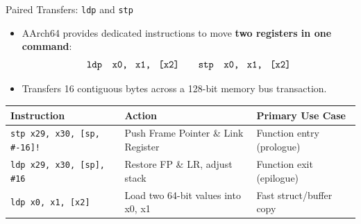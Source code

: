 \documentclass[aspectratio=169,11pt,t]{beamer}
\newcommand{\key}[1]{\textbf{#1}}
\newcommand{\code}[1]{\texttt{#1}}
\begin{document}
\begin{frame}{Paired Transfers: \texttt{ldp} and \texttt{stp}}
\large
\begin{itemize}\setlength{\itemsep}{6pt}
  \item AArch64 provides dedicated instructions to move \key{two registers in one command}:
  $$\code{ldp\quad x0,\; x1,\; [x2]} \qquad \code{stp\quad x0,\; x1,\; [x2]}$$
  \item Transfers 16 contiguous bytes across a 128-bit memory bus transaction.
\end{itemize}

\vspace{0.2cm}
\begin{center}
\small
\setlength{\tabcolsep}{8pt}
\begin{tabular}{lll}
\toprule
\textbf{Instruction} & \textbf{Action} & \textbf{Primary Use Case} \\
\midrule
\code{stp x29, x30, [sp, \#-16]!} & Push Frame Pointer \& Link Register & Function entry (prologue) \\
\code{ldp x29, x30, [sp], \#16}   & Restore FP \& LR, adjust stack      & Function exit (epilogue) \\
\code{ldp x0, x1, [x2]}           & Load two 64-bit values into x0, x1  & Fast struct/buffer copy \\
\bottomrule
\end{tabular}
\end{center}
\end{frame}

\end{document}
